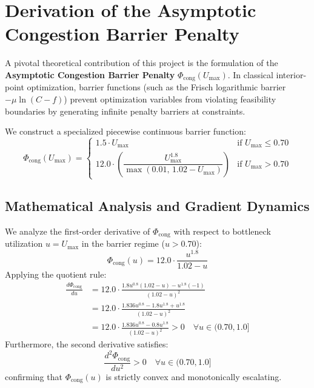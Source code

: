 \section{Derivation of the Asymptotic Congestion Barrier Penalty}
A pivotal theoretical contribution of this project is the formulation of the \textbf{Asymptotic Congestion Barrier Penalty} $\Phi_{\text{cong}}(U_{\max})$. In classical interior-point optimization, barrier functions (such as the Frisch logarithmic barrier $-\mu \ln(C - f)$) prevent optimization variables from violating feasibility boundaries by generating infinite penalty barriers at constraints.

We construct a specialized piecewise continuous barrier function:
\begin{equation}
    \Phi_{\text{cong}}(U_{\max}) = \begin{cases}
        1.5 \cdot U_{\max} & \text{if } U_{\max} \le 0.70 \\[0.5em]
        12.0 \cdot \left( \dfrac{U_{\max}^{1.8}}{\max(0.01, \, 1.02 - U_{\max})} \right) & \text{if } U_{\max} > 0.70
    \end{cases}
    \label{eq:barrier_penalty_formal}
\end{equation}

\subsection{Mathematical Analysis and Gradient Dynamics}
We analyze the first-order derivative of $\Phi_{\text{cong}}$ with respect to bottleneck utilization $u = U_{\max}$ in the barrier regime ($u > 0.70$):
\begin{equation}
    \Phi_{\text{cong}}(u) = 12.0 \cdot \frac{u^{1.8}}{1.02 - u}
\end{equation}
Applying the quotient rule:
\begin{align}
    \frac{d \Phi_{\text{cong}}}{du} &= 12.0 \cdot \frac{1.8 u^{0.8}(1.02 - u) - u^{1.8}(-1)}{(1.02 - u)^2} \nonumber \\
    &= 12.0 \cdot \frac{1.836 u^{0.8} - 1.8 u^{1.8} + u^{1.8}}{(1.02 - u)^2} \nonumber \\
    &= 12.0 \cdot \frac{1.836 u^{0.8} - 0.8 u^{1.8}}{(1.02 - u)^2} > 0 \quad \forall u \in (0.70, 1.0]
\end{align}
Furthermore, the second derivative satisfies:
\begin{equation}
    \frac{d^2 \Phi_{\text{cong}}}{du^2} > 0 \quad \forall u \in (0.70, 1.0]
\end{equation}
confirming that $\Phi_{\text{cong}}(u)$ is strictly convex and monotonically escalating.

